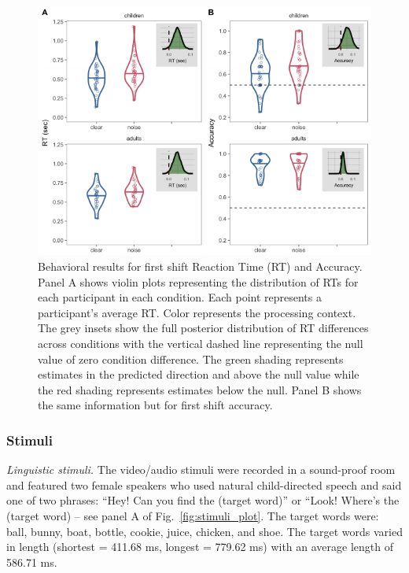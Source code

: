 \documentclass[10pt, letterpaper]{article}
\newenvironment{CodeChunk}{}{}
\begin{document}
\begin{CodeChunk}
\begin{figure}[t]

{\centering \includegraphics[width=0.75\linewidth]{figs/noise_acc_rt_e1_plot-1} 

}

\caption[Behavioral results for first shift Reaction Time (RT) and Accuracy]{Behavioral results for first shift Reaction Time (RT) and Accuracy. Panel A shows violin plots representing the distribution of RTs for each participant in each condition. Each point represents a participant's average RT. Color represents the processing context. The grey insets show the full posterior distribution of RT differences across conditions with the vertical dashed line representing the null value of zero condition difference. The green shading represents estimates in the predicted direction and above the null value while the red shading represents estimates below the null. Panel B shows the same information but for first shift accuracy.}\label{fig:noise_acc_rt_e1_plot}
\end{figure}
\end{CodeChunk}

\subsubsection{Stimuli}\label{stimuli}

\emph{Linguistic stimuli.} The video/audio stimuli were recorded in a
sound-proof room and featured two female speakers who used natural
child-directed speech and said one of two phrases: ``Hey! Can you find
the (target word)'' or ``Look! Where's the (target word) -- see panel A
of Fig.~\ref{fig:stimuli_plot}. The target words were: ball, bunny,
boat, bottle, cookie, juice, chicken, and shoe. The target words varied
in length (shortest = 411.68 ms, longest = 779.62 ms) with an average
length of 586.71 ms.
\end{document}

